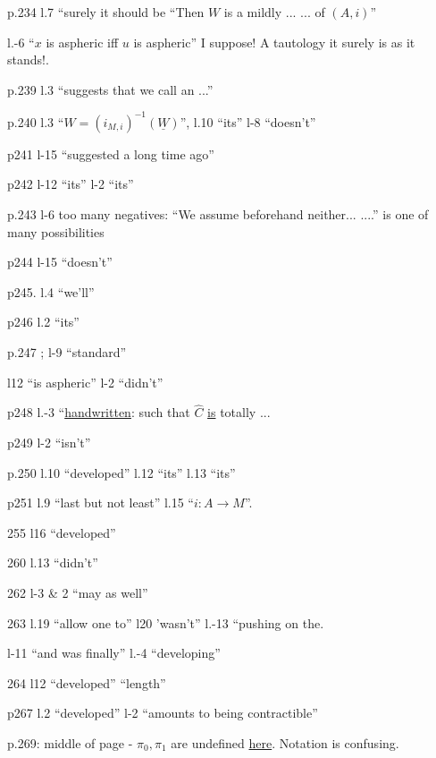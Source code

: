 p.234 l.7 ``surely it should be ``Then $W$ is a mildly ... ... of $(A,i)$''

 l.-6 ``$x$ is aspheric  iff $u$ is aspheric'' I suppose! A tautology it surely is as it stands!.

p.239 l.3 ``suggests that we call an ...''

p.240 l.3 ``$W=(i_{M,i})^{-1}(\underline{W})$'', l.10 ``its'' l-8 ``doesn't''

p241 l-15 ``suggested a long time ago''

p242 l-12 ``its'' l-2 ``its''

p.243 l-6 too many negatives: ``We assume beforehand neither... ....'' is one of many possibilities

p244 l-15 ``doesn't''

p245. l.4 ``we'll''

p246 l.2 ``its''

p.247    ; l-9 ``standard''

l12 ``is aspheric'' l-2 ``didn't''

p248 l.-3 ``\uline{handwritten}: such that $\widehat C$ \uline{is} totally ...

p249 l-2 ``isn't''

p.250 l.10 ``developed'' l.12 ``its'' l.13 ``its''

p251 l.9 ``last but not least'' l.15 ``$i\colon A\to M$''.

 255 l16 ``developed''

260 l.13 ``didn't''

262  l-3 \& \unsure{-}2 ``may as well''

263 l.19 ``allow one to'' l20 'wasn't'' l.-13 ``pushing on the.

l-11 ``and was finally'' l.-4 ``developing''

264 l12 ``developed'' ``length''

p267 l.2 ``developed'' l-2 ``amounts to  being contractible''

p.269: middle of page -   $\pi_0,\pi_1$ are undefined \uline{here}. Notation is confusing.

